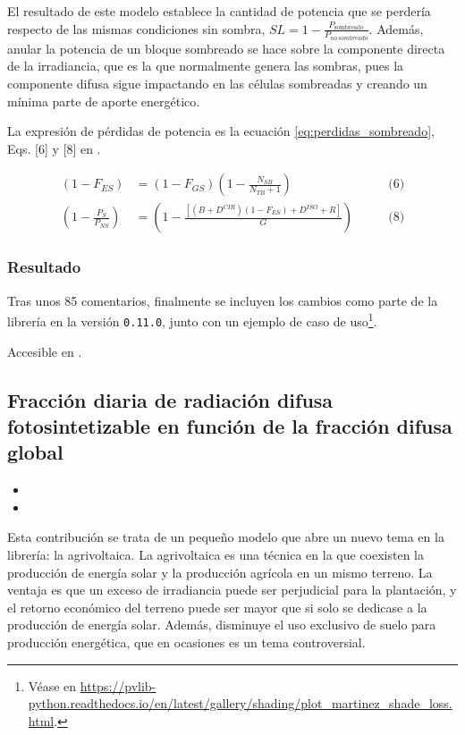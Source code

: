 El resultado de este modelo establece la cantidad de potencia que se perdería respecto de las mismas condiciones sin sombra, $SL = 1 - \frac{P_\text{sombreado}}{P_{no\,sombreado}}$. Además, anular la potencia de un bloque sombreado se hace sobre la componente directa de la irradiancia, que es la que normalmente genera las sombras, pues la componente difusa sigue impactando en las células sombreadas y creando un mínima parte de aporte energético.

La expresión de pérdidas de potencia es la ecuación \ref{eq:perdidas_sombreado}, Eqs. [6] y [8] en \cite{Martínez-Moreno_Muñoz_Lorenzo_2010}.

\begin{equation} \label{eq:perdidas_sombreado}
    \begin{alignedat}{3}
        (1 - F_{ES}) &= (1 - F_{GS}) \left(1 - \frac{N_{SB}}{N_{TB} + 1}\right) \qquad &\text{(6)}\\
        \left(1 - \frac{P_{S}}{P_{NS}}\right) &= \left(1 - \frac{\left[(B + D^{CIR})(1 - F_{ES}) + D^{ISO} + R\right]}{G}\right) \qquad &\text{(8)}
    \end{alignedat}
\end{equation}

\subsubsection{Resultado}

Tras unos 85 comentarios, finalmente se incluyen los cambios como parte de la librería en la versión \texttt{0.11.0}, junto con un ejemplo de caso de uso\footnote{Véase en \url{https://pvlib-python.readthedocs.io/en/latest/gallery/shading/plot_martinez_shade_loss.html}.}.

Accesible en .

\subsection{Fracción diaria de radiación difusa fotosintetizable en función de la fracción difusa global}

\begin{itemize}
    \item {}
    \item {}
\end{itemize}

Esta contribución se trata de un pequeño modelo que abre un nuevo tema en la librería: la agrivoltaica. La agrivoltaica es una técnica en la que coexisten la producción de energía solar y la producción agrícola en un mismo terreno. La ventaja es que un exceso de irradiancia puede ser perjudicial para la plantación, y el retorno económico del terreno puede ser mayor que si solo se dedicase a la producción de energía solar. Además, disminuye el uso exclusivo de suelo para producción energética, que en ocasiones es un tema controversial.

